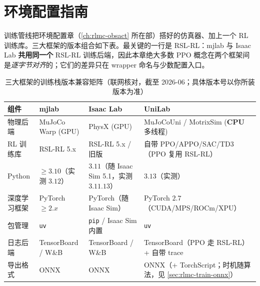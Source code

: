 \section*{环境配置指南}
\label{sec:rlmc-train-setup}

训练管线把环境配置章（\cref{ch:rlmc-obsact} 所在部）搭好的仿真器、加上一个 RL 训练库。三大框架的版本组合如下表。最关键的一行是 RSL-RL：mjlab 与 Isaac Lab \textbf{共用同一个} RSL-RL 训练后端，因此本章绝大多数 PPO 概念在两个框架间是\emph{逐字节对齐}的；它们的差异只在 wrapper 命名与少数配置入口。

\begin{table}[H]
\centering
\caption{三大框架的训练栈版本兼容矩阵（联网核对，截至 2026-06；具体版本号以你所装版本为准）}
\label{tab:rlmc-train-versions}
\begin{tabularx}{\linewidth}{lLLL}
\hline
组件 & mjlab & Isaac Lab & UniLab \\
\hline
物理后端 & MuJoCo Warp (GPU) & PhysX (GPU) & MuJoCoUni / MotrixSim (\textbf{CPU} 多线程) \\
RL 训练库 & RSL-RL 5.x & RSL-RL 5.x / 旧版 & 自带 PPO/APPO/SAC/TD3（PPO 复用 RSL-RL） \\
Python & $\ge 3.10$（实测 $3.12$） & $3.11$（随 Isaac Sim 5.1，实测 $3.11.13$） & $3.13$（实测） \\
深度学习框架 & PyTorch $\ge 2.x$ & PyTorch（随 Isaac Sim） & PyTorch $2.7$（CUDA/MPS/ROCm/XPU） \\
包管理 & \verb|uv| & \verb|pip| / Isaac Sim 内置 & \verb|uv| \\
日志后端 & TensorBoard / W\&B & TensorBoard / W\&B & TensorBoard（PPO 走 RSL-RL）+ 自带 trace \\
导出格式 & ONNX & ONNX & ONNX（+ TorchScript；时机随算法，见 \cref{sec:rlmc-train-onnx}） \\
\hline
\end{tabularx}
\end{table}

